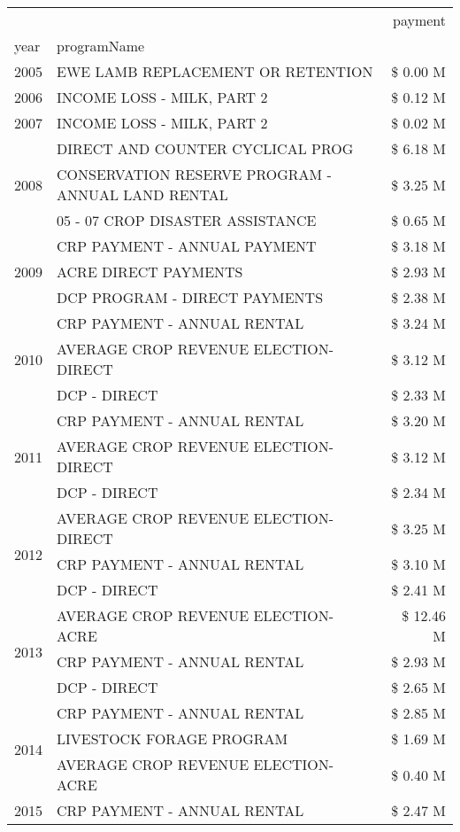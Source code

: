 \begin{tabular}{llr}
\toprule
 &  & payment \\
year & programName &  \\
\midrule
2005 & EWE LAMB REPLACEMENT OR RETENTION & \$ 0.00 M \\
\cline{1-3}
2006 & INCOME LOSS - MILK, PART 2 & \$ 0.12 M \\
\cline{1-3}
2007 & INCOME LOSS - MILK, PART 2 & \$ 0.02 M \\
\cline{1-3}
\multirow[t]{3}{*}{2008} & DIRECT AND COUNTER CYCLICAL PROG & \$ 6.18 M \\
 & CONSERVATION RESERVE PROGRAM - ANNUAL LAND RENTAL & \$ 3.25 M \\
 & 05 - 07 CROP DISASTER ASSISTANCE & \$ 0.65 M \\
\cline{1-3}
\multirow[t]{3}{*}{2009} & CRP PAYMENT - ANNUAL PAYMENT & \$ 3.18 M \\
 & ACRE DIRECT PAYMENTS & \$ 2.93 M \\
 & DCP PROGRAM - DIRECT PAYMENTS & \$ 2.38 M \\
\cline{1-3}
\multirow[t]{3}{*}{2010} & CRP PAYMENT - ANNUAL RENTAL & \$ 3.24 M \\
 & AVERAGE CROP REVENUE ELECTION-DIRECT & \$ 3.12 M \\
 & DCP - DIRECT & \$ 2.33 M \\
\cline{1-3}
\multirow[t]{3}{*}{2011} & CRP PAYMENT - ANNUAL RENTAL & \$ 3.20 M \\
 & AVERAGE CROP REVENUE ELECTION-DIRECT & \$ 3.12 M \\
 & DCP - DIRECT & \$ 2.34 M \\
\cline{1-3}
\multirow[t]{3}{*}{2012} & AVERAGE CROP REVENUE ELECTION-DIRECT & \$ 3.25 M \\
 & CRP PAYMENT - ANNUAL RENTAL & \$ 3.10 M \\
 & DCP - DIRECT & \$ 2.41 M \\
\cline{1-3}
\multirow[t]{3}{*}{2013} & AVERAGE CROP REVENUE ELECTION-ACRE & \$ 12.46 M \\
 & CRP PAYMENT - ANNUAL RENTAL & \$ 2.93 M \\
 & DCP - DIRECT & \$ 2.65 M \\
\cline{1-3}
\multirow[t]{3}{*}{2014} & CRP PAYMENT - ANNUAL RENTAL & \$ 2.85 M \\
 & LIVESTOCK FORAGE PROGRAM & \$ 1.69 M \\
 & AVERAGE CROP REVENUE ELECTION-ACRE & \$ 0.40 M \\
\cline{1-3}
\multirow[t]{3}{*}{2015} & CRP PAYMENT - ANNUAL RENTAL & \$ 2.47 M \\

\end{tabular}
